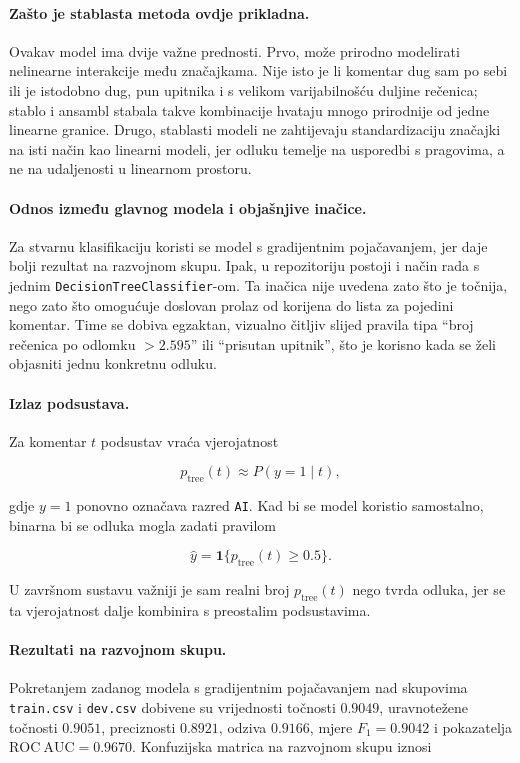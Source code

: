 \documentclass{article}
\begin{document}
\paragraph{Zašto je stablasta metoda ovdje prikladna.}
Ovakav model ima dvije važne prednosti. Prvo, može prirodno modelirati nelinearne interakcije među značajkama. Nije isto je li komentar dug sam po sebi ili je istodobno dug, pun upitnika i s velikom varijabilnošću duljine rečenica; stablo i ansambl stabala takve kombinacije hvataju mnogo prirodnije od jedne linearne granice. Drugo, stablasti modeli ne zahtijevaju standardizaciju značajki na isti način kao linearni modeli, jer odluku temelje na usporedbi s pragovima, a ne na udaljenosti u linearnom prostoru.

\paragraph{Odnos između glavnog modela i objašnjive inačice.}
Za stvarnu klasifikaciju koristi se model s gradijentnim pojačavanjem, jer daje bolji rezultat na razvojnom skupu. Ipak, u repozitoriju postoji i način rada s jednim \texttt{DecisionTreeClassifier}-om. Ta inačica nije uvedena zato što je točnija, nego zato što omogućuje doslovan prolaz od korijena do lista za pojedini komentar. Time se dobiva egzaktan, vizualno čitljiv slijed pravila tipa ``broj rečenica po odlomku $> 2.595$'' ili ``prisutan upitnik'', što je korisno kada se želi objasniti jednu konkretnu odluku.

\paragraph{Izlaz podsustava.}
Za komentar $t$ podsustav vraća vjerojatnost

\[
p_{\mathrm{tree}}(t) \approx P(y=1\mid t),
\]

gdje $y=1$ ponovno označava razred \texttt{AI}. Kad bi se model koristio samostalno, binarna bi se odluka mogla zadati pravilom

\[
\hat y = \mathbf{1}\{p_{\mathrm{tree}}(t)\ge 0.5\}.
\]

U završnom sustavu važniji je sam realni broj $p_{\mathrm{tree}}(t)$ nego tvrda odluka, jer se ta vjerojatnost dalje kombinira s preostalim podsustavima.

\paragraph{Rezultati na razvojnom skupu.}
Pokretanjem zadanog modela s gradijentnim pojačavanjem nad skupovima \texttt{train.csv} i \texttt{dev.csv} dobivene su vrijednosti točnosti $0.9049$, uravnotežene točnosti $0.9051$, preciznosti $0.8921$, odziva $0.9166$, mjere $F_1=0.9042$ i pokazatelja $\mathrm{ROC\ AUC}=0.9670$. Konfuzijska matrica na razvojnom skupu iznosi
\end{document}
